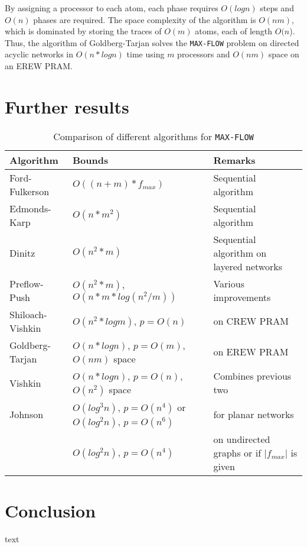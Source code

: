 \documentclass[a4paper,10pt, twocolumn]{article}
\begin{document}
By assigning a processor to each atom, each phase requires $O(log n)$ steps and $O(n)$ phases are required. The space complexity of the algorithm is $O(nm)$, which is dominated by storing the traces of $O(m)$ atoms, each of length $O(n$). Thus, the algorithm of Goldberg-Tarjan solves the \lstinline|MAX-FLOW| problem on directed acyclic networks in $O(n*log n)$ time using $m$ processors and $O(nm)$ space on an EREW PRAM\cite{goldberg89}.


\section{Further results}
\label{sec:further}

\begin{table*}
\begin{tabular}{|l|l|l|}
\hline
Algorithm & Bounds & Remarks \\
\hline
Ford-Fulkerson\cite{ahuja93} & $O((n+m) * f_{max})$ & Sequential algorithm \\
Edmonds-Karp\cite{ahuja93} & $O(n*m^2)$ & Sequential algorithm  \\
Dinitz\cite{dinitz70}& $O(n^2*m)$ & Sequential algorithm on layered networks\\
Preflow-Push\cite{ahuja93} & $O(n^2*m)$, $O(n*m*log(n^2/m))$ & Various improvements\\
Shiloach-Vishkin\cite{yossi81} & $O(n^2*log m)$, $p=O(n)$ & on CREW PRAM\\
Goldberg-Tarjan\cite{goldberg89} & $O(n*log n)$, $p=O(m)$, $O(nm)$ space & on EREW PRAM \\
Vishkin\cite{vishkin92} & $O(n*log n)$, $p=O(n)$, $O(n^2)$ space & Combines previous two\\
Johnson\cite{johnson87} & $O(log^{3} n)$, $p=O(n^{4})$ or $O(log^{2} n)$, $p=O(n^{6})$ &
for planar networks\\
 & $	O(log^{2} n)$, $p=O(n^{4})$ & on undirected graphs or if  $\lvert f_{max} \rvert$ is given\\
\hline
\end{tabular}
\caption{Comparison of different algorithms for \lstinline|MAX-FLOW|}
\label{tbl:results}
\end{table*}


\section{Conclusion}
text \cite{ahuja93} \cite{papa95} \cite{yossi81} \cite{vishkin92} \cite{goldberg89} \cite{goldberg91} \cite{goldberg98} \cite{johnson87} \cite{schieber89} \cite{cherivan89} 

\printbibliography
\end{document}
